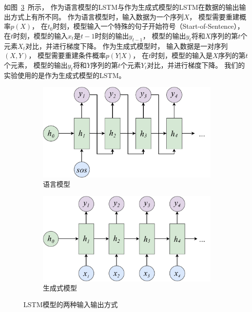 如图~\ref{fig:LSTM_IO}~所示，
作为语言模型的LSTM与作为生成式模型的LSTM在数据的输出输出方式上有所不同。
作为语言模型时，输入数据为一个序列$X$，
模型需要重建概率$p(X)$，
在$t_0$时刻，模型输入一个特殊的句子开始符号（Start-of-Sentence），
在$t$时刻，模型的输入$x_t$是$t-1$时刻的输出$y_{t-1}$，
模型的输出$y_t$将和$X$序列的第$t$个元素$X_t$对比，并进行梯度下降。
作为生成式模型时，
输入数据是一对序列$(X, Y)$，
模型需要重建条件概率$p(Y|X)$，
在$t$时刻，模型的输入是$X$序列的第$t$个元素，
模型的输出$y_t$将和$Y$序列的第$t$个元素$Y_t$对比，并进行梯度下降。
我们的实验使用的是作为生成式模型的LSTM。
\begin{figure}[H]
    \begin{subfigure}{0.4\linewidth}
        \includegraphics[width=\linewidth]{figure/drawio/RNNLM_lm_v2.pdf}
        \centering
        \caption{语言模型}
        \label{fig:RNNLM_}
    \end{subfigure}%
    \begin{subfigure}{0.4\linewidth}
        \includegraphics[width=\linewidth]{figure/drawio/RNNLM_generative_v1.pdf}
        \centering
        \caption{生成式模型}
        \label{fig:RNNLM_generative_v1}
    \end{subfigure}
    \centering
    \caption{LSTM模型的两种输入输出方式}
    \label{fig:LSTM_IO}
\end{figure}


